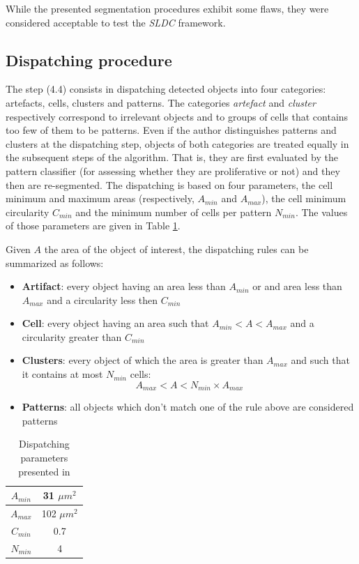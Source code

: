 While the presented segmentation procedures exhibit some flaws, they were considered acceptable to test the \textit{SLDC} framework.

\subsection{Dispatching procedure}
\label{ssec:thyroid_ad_dispatch}
The step (4.4) consists in dispatching detected objects into four categories: artefacts, cells, clusters and patterns. The categories \textit{artefact} and \textit{cluster} respectively correspond to irrelevant objects and to groups of cells that contains too few of them to be patterns. Even if the author distinguishes patterns and clusters at the dispatching step, objects of both categories are treated equally in the subsequent steps of the algorithm. That is, they are first evaluated by the pattern classifier (for assessing whether they are proliferative or not) and they then are re-segmented. The dispatching is based on four parameters, the cell minimum and maximum areas (respectively, $A_{min}$ and $A_{max}$), the cell minimum circularity $C_{min}$ and the minimum number of cells per pattern $N_{min}$. The values of those parameters are given in Table \ref{tab:adeb_disp_rules}. 

Given $A$ the area of the object of interest, the dispatching rules can be summarized as follows:

\begin{itemize}
	\item \textbf{Artifact}: every object having an area less than $A_{min}$ or and area less than $A_{max}$ and a circularity less then $C_{min}$
	\item \textbf{Cell}: every object having an area such that $A_{min} < A < A_{max}$ and a circularity greater than $C_{min}$
	\item \textbf{Clusters}: every object of which the area is greater than $A_{max}$ and such that it contains at most $N_{min}$ cells:
	\[
		A_{max} < A < N_{min} \times A_{max}
	\]
	\item \textbf{Patterns}: all objects which don't match one of the rule above are considered patterns
\end{itemize}

\begin{table}
	\center
	\begin{tabular}{|c|c|}
		\hline
		$A_{min}$ & 31 $\mu m^2$\\
		\hline
		$A_{max}$ & 102 $\mu m^2$\\
		\hline
		$C_{min}$ & 0.7 \\
		\hline
		$N_{min}$ & 4\\
		\hline
	\end{tabular}
	\caption{Dispatching parameters presented in \cite{adeblire2013}}
	\label{tab:adeb_disp_rules}
\end{table}

